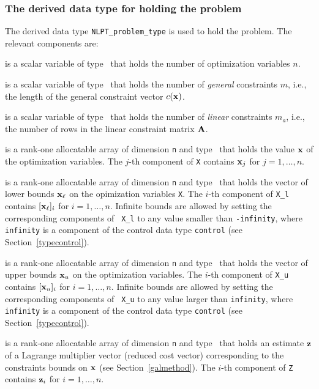 \documentclass{galahad}
\begin{document}

\subsubsection{The derived data type for holding the problem}\label{typeprob}
The derived data type {\tt NLPT\_problem\_type} is used to hold the
problem. The relevant components are:

\begin{description}

 is a scalar variable of type \integer\ 
 that holds the number of optimization variables $n$.

 is a scalar variable of type \integer\
 that holds the number of {\em general} constraints $m$, i.e., the length
 of the general constraint vector $c({\mathbf{x}})$.

 is a scalar variable of type \integer\ 
 that holds the number of {\em linear} constraints $m_a$, i.e., the number
 of rows in the linear constraint matrix ${\mathbf{A}}$.

\ittf{X} is a rank-one allocatable array of dimension {\tt n} and type 
\realdp\ that holds the value ${\mathbf{x}}$ of the optimization variables.
The $j$-th component of {\tt X} contains
${\mathbf{x}}_{j}$ for $j = 1,  \ldots , n$.

\ittf{X\_l} is a rank-one allocatable array of dimension {\tt n}
and type \realdp\ that holds the vector of lower bounds
${\mathbf{x}}_\ell$ on the opimization variables {\tt X}. The $i$-th component of
{\tt X\_l} contains $[{\mathbf{x}}_\ell]_i$ for $i = 1, \ldots , n$.  Infinite
bounds are allowed by setting the corresponding components of {\tt
  X\_l} to any value smaller than {\tt -infinity}, where {\tt
  infinity} is a component of the control data type {\tt control} (see
Section~\ref{typecontrol}).

\ittf{X\_u}  is a rank-one allocatable array of dimension {\tt n}
and type \realdp\ that holds the vector of upper bounds
${\mathbf{x}}_u$ on the optimization variables.  The $i$-th component of
{\tt X\_u} contains $[{\mathbf{x}}_u]_i$ for $i = 1, \ldots , n$.  Infinite
bounds are allowed by setting the corresponding components of {\tt
  X\_u} to any value larger than {\tt infinity}, where {\tt
  infinity} is a component of the control data type {\tt control} (see
Section~\ref{typecontrol}).

\ittf{Z} is a rank-one allocatable array of dimension {\tt n} and type 
\realdp\ that holds an estimate ${\mathbf{z}}$ of a Lagrange
multiplier vector (reduced cost vector) corresponding to the
constraints bounds on ${\mathbf{x}}$ (see Section~\ref{galmethod}).
The $i$-th component of {\tt Z} contains ${\mathbf{z}}_{i}$ for $i = 1,
\ldots , n$.


\end{description}
\end{document}
